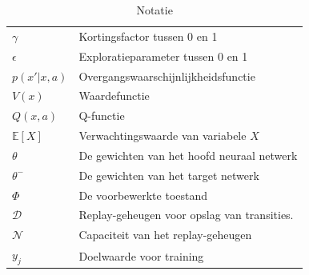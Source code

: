 \documentclass[a4paper,10pt]{report}
\begin{document}
\begin{table}[h]
\begin{tabular}{>{\raggedright}p{2.5cm} >{\raggedright\arraybackslash}p{10cm}}
        $\gamma$                 & Kortingsfactor tussen 0 en 1                \\
        $\epsilon$               & Exploratieparameter tussen 0 en 1           \\
        $p(x'|x, a)$             & Overgangswaarschijnlijkheidsfunctie         \\
        $V(x)$                   & Waardefunctie                               \\
        $Q(x, a)$                & Q-functie                                   \\
        $\mathbb{E}[X]$          & Verwachtingswaarde van variabele $X$        \\
        $\theta$                 & De gewichten van het hoofd neuraal netwerk  \\
        $\theta^-$               & De gewichten van het target netwerk         \\
        $\Phi$                   & De voorbewerkte toestand                    \\
        $\mathcal{D}$            & Replay-geheugen voor opslag van transities. \\
        $\mathcal{N}$            & Capaciteit van het replay-geheugen          \\
        $y_j$                    & Doelwaarde voor training                    \\

    \end{tabular}
    \caption{Notatie}
\end{table}




    
\end{document}
